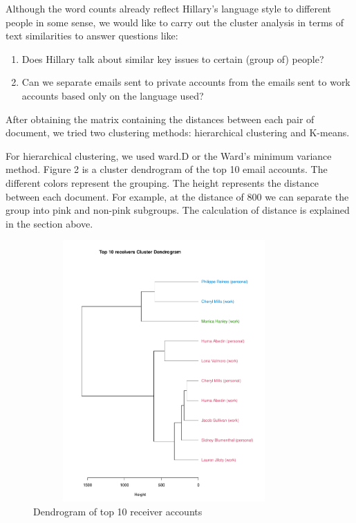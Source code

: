 Although the word counts already reflect Hillary's language style to different people in some sense, we would like to carry out the cluster analysis in terms of text similarities to answer questions like: 
\begin{enumerate}
  \item Does Hillary talk about similar key issues to certain (group of) people?
  \item Can we separate emails sent to private accounts from the emails sent to work accounts based only on the language used?
\end{enumerate}

After obtaining the matrix containing the distances between each pair of document, we tried two clustering methods: hierarchical clustering and K-means. 

For hierarchical clustering, we used ward.D or the Ward's minimum variance method. Figure 2 is a cluster dendrogram of the top 10 email accounts. The different colors represent the grouping. The height represents the distance between each document. For example, at the distance of 800 we can separate the group into pink and non-pink subgroups. The calculation of distance is explained in the section above.
\begin{figure}[h!]
    \centering
    \includegraphics[width=10cm,height=10cm]
    {daitong_and_yihe/clusterp.pdf}
    \caption{Dendrogram of top 10 receiver accounts}
\end{figure}

